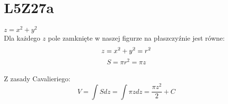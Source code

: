 \documentclass{article}
\title{}
\date{22.11.2020}
\author{Maurycy Borkowski}
\begin{document}
\maketitle

\section{L5Z27a}
$z = x^2 + y^2$\\
Dla każdego $z$ pole zamknięte w naszej figurze na płaszczyźnie jest równe:
$$
z = x^2 + y^2 = r^2\\
$$
$$
S = \pi r^2 = \pi z
$$
\\Z zasady Cavalieriego:
$$
V = \int Sdz = \int \pi z dz = \frac{\pi z^2}{2} + C
$$
\end{document}
